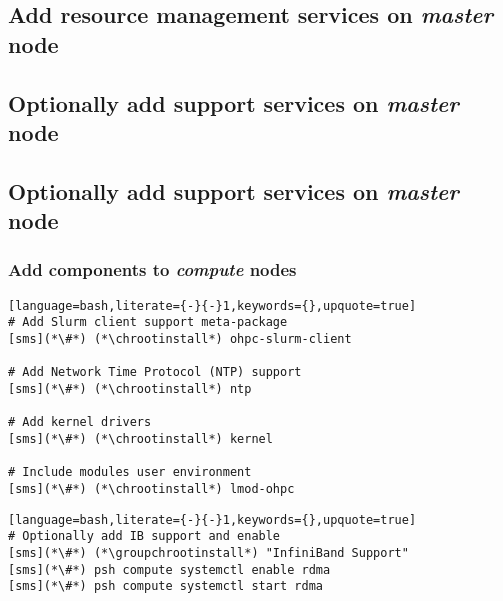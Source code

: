 \documentclass[letterpaper]{article}
\newcommand{\chrootinstall}{psh compute yum -y install}
\newcommand{\groupchrootinstall}{psh compute yum -y groupinstall}
\begin{document}
\subsection{Add resource management services on {\em master} node} \label{sec:add_rm}


\subsection{Optionally add \InfiniBand{} support services on {\em master} node} \label{sec:add_ofed}


\subsection{Optionally add \OmniPath{} support services on {\em master} node} \label{sec:add_opa}


\vspace*{-0.2cm}
\subsubsection{Add \OHPC{} components to {\em compute} nodes} \label{sec:add_components}


\begin{lstlisting}[language=bash,literate={-}{-}1,keywords={},upquote=true]
# Add Slurm client support meta-package
[sms](*\#*) (*\chrootinstall*) ohpc-slurm-client

# Add Network Time Protocol (NTP) support
[sms](*\#*) (*\chrootinstall*) ntp

# Add kernel drivers
[sms](*\#*) (*\chrootinstall*) kernel

# Include modules user environment
[sms](*\#*) (*\chrootinstall*) lmod-ohpc
\end{lstlisting}

\begin{lstlisting}[language=bash,literate={-}{-}1,keywords={},upquote=true]
# Optionally add IB support and enable
[sms](*\#*) (*\groupchrootinstall*) "InfiniBand Support"
[sms](*\#*) psh compute systemctl enable rdma
[sms](*\#*) psh compute systemctl start rdma
\end{lstlisting}
\end{document}
